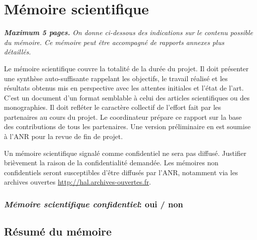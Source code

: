 \documentclass[a4paper,11pt]{article}
\newcommand{\instructions}[1]{%
		{%
			\setlength{\parindent}{0cm}%
			{\em\color{ANRvert}#1}%
		}%
	}
\newcommand{\instructions}[1]{}
\begin{document}




\section{Mémoire scientifique}

\instructions{%
\textbf{Maximum 5 pages.} On donne ci-dessous des indications sur le contenu possible du mémoire. Ce mémoire peut être accompagné de rapports annexes plus détaillés.

\bigskip

Le mémoire scientifique couvre la totalité de la durée du projet. Il doit présenter une synthèse auto-suffisante rappelant les objectifs, le travail réalisé et les résultats obtenus mis en perspective avec les attentes initiales et l'état de l'art. C'est un document d'un format semblable à celui des articles scientifiques ou des monographies. Il doit refléter le caractère collectif de l'effort fait par les partenaires au cours du projet. Le coordinateur prépare ce rapport sur la base des contributions de tous les partenaires. Une version préliminaire en est soumise à l'ANR pour la revue de fin de projet. 

\bigskip

Un mémoire scientifique signalé comme confidentiel ne sera pas diffusé. Justifier brièvement la raison de la confidentialité demandée. Les mémoires non confidentiels seront susceptibles d'être diffusés par l'ANR, notamment via les archives ouvertes \url{http://hal.archives-ouvertes.fr}.
}

\bigskip

\subsubsection{\emph{Mémoire scientifique confidentiel}: oui / non}


\subsection{Résumé du mémoire}
\end{document}
